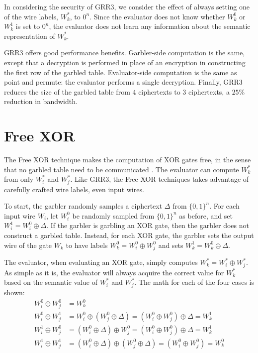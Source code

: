 In considering the security of GRR3, we consider the effect of always setting one of the wire labels, $W_k^*$, to $0^n$.
Since the evaluator does not know whether $W_k^0$ or $W_k^1$ is set to $0^n$, the evaluator does not learn any information about the semantic representation of $W_k^*$.

GRR3 offers good performance benefits.
Garbler-side computation is the same, except that a decryption is performed in place of an encryption in constructing the first row of the garbled table.
Evaluator-side computation is the same as point and permute: the evaluator performs a single decryption.
Finally, GRR3 reduces the size of the garbled table from $4$ ciphertexts to $3$ ciphertexts, a $25\%$ reduction in bandwidth.

\section{Free XOR}
The Free XOR technique makes the computation of XOR gates free, in the sense that no garbled table need to be communicated \cite{freexor}.
The evaluator can compute $W_k^*$ from only $W_i^*$ and $W_j^*$.
Like GRR3, the Free XOR techniques takes advantage of carefully crafted wire labels, even input wires.

To start, the garbler randomly samples a ciphertext $\Delta$ from $\{0,1\}^n$.
For each input wire $W_i$, let $W_i^0$ be randomly sampled from $\{0,1\}^n$ as before, and set $W_i^1 = W_i^0 \oplus \Delta$.
If the garbler is garbling an XOR gate, then the garbler does not construct a garbled table.
Instead, for each XOR gate, the garbler sets the output wire of the gate $W_k$ to have labels $W_k^0 = W_i^0 \oplus W_j^0$ and sets $W_k^1 = W_k^0 \oplus \Delta$.

The evaluator, when evaluating an XOR gate, simply computes $W_k^* = W_i^* \oplus W_j^*$.
As simple as it is, the evaluator will always acquire the correct value for $W_k^*$ based on the semantic value of $W_i^*$ and $W_j^*$.
The math for each of the four cases is shown:
\begin{align*}
    W_i^0 \oplus W_j^0 & = W_k^0 \\
    W_i^0 \oplus W_j^1 & = W_i^0 \oplus (W_j^0 \oplus \Delta) = (W_i^0 \oplus W_j^0) \oplus \Delta = W_k^1 \\
    W_i^1 \oplus W_j^0 & = (W_i^0 \oplus \Delta) \oplus W_j^0 = (W_i^0 \oplus W_j^0) \oplus \Delta = W_k^1 \\
    W_i^1 \oplus W_j^1 & = (W_i^0 \oplus \Delta) \oplus (W_j^0 \oplus \Delta) = (W_i^0 \oplus W_j^0) = W_k^0
\end{align*}

